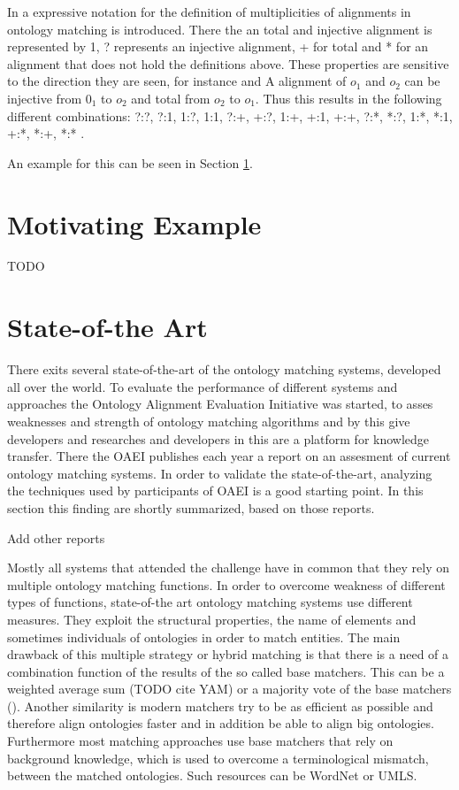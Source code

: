 \documentclass[11pt,titlepage,oneside,openany,a4paper]{report}
\begin{document}
In \cite{euzenat2003towards} a expressive notation for the definition of multiplicities of alignments in ontology matching is introduced. There the an total and injective alignment is represented by 1, ? represents an injective alignment, + for total and * for an alignment that does not hold the definitions above. These properties are sensitive to the direction they are seen, for instance and A alignment of $o_1$ and $o_2$ can be injective from $0_1$ to $o_2$ and total from $o_2$ to $o_1$. Thus this results in the following different combinations: ?:?, ?:1, 1:?, 1:1, ?:+, +:?, 1:+, +:1, +:+, ?:*, *:?, 1:*, *:1, +:*, *:+, *:* .

An example for this can be seen in Section \ref{sec:motivating_example}.
\section{Motivating Example}
\label{sec:motivating_example}
TODO
\section{State-of-the Art}
\label{sec:state_of_the_art}
There exits several state-of-the-art of the ontology matching systems, developed all over the world. To evaluate the performance of different systems and approaches the Ontology Alignment Evaluation Initiative was started, to asses weaknesses and strength of ontology matching algorithms and by this give developers and researches and developers in this are a platform for knowledge transfer. \cite{Euzenat:2011aa} 
There the OAEI publishes each year a report on an assesment of current ontology matching systems. In order to validate the state-of-the-art, analyzing the techniques used by participants of OAEI is a good starting point. In this section this finding are shortly summarized, based on those reports. \cite{euzenat2014} 
\begin{Huge}
Add other reports
\end{Huge}

Mostly all systems that attended the challenge have in common that  they rely on multiple ontology matching functions. In order to overcome weakness of different types of functions, state-of-the art ontology matching systems use different measures. They exploit the structural properties, the name of elements and sometimes individuals of ontologies in order to match entities. The main drawback of this multiple strategy or hybrid matching is that there is a need of a combination function of the results of the so called base matchers. This can be a weighted average sum (TODO cite YAM) or a majority vote of the base matchers (\cite{Eckert:2009:IOM:1561533.1561553}). \cite{6104044}
Another similarity is modern matchers try to be as efficient as possible and therefore align ontologies faster and in addition be able to align big ontologies.\cite{Rahm:2011aa}
Furthermore most matching approaches use base matchers that rely on background knowledge, which is used to overcome a terminological mismatch, between the matched ontologies. Such resources can be WordNet \cite{fellbaum1998wordnet} or UMLS\cite{bodenreider2004unified}. \cite{Euzenat:2011aa} 
\end{document}
